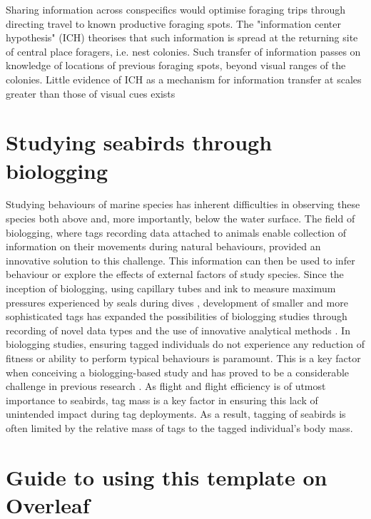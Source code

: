 \documentclass[9pt,twocolumn,twoside,lineno]{pnas-new}
\begin{document}

Sharing information across conspecifics would optimise foraging trips through directing travel to known productive foraging spots. The "information center hypothesis" (ICH) theorises that such information is spread at the returning site of central place foragers, i.e. nest colonies. Such transfer of information passes on knowledge of locations of previous foraging spots, beyond visual ranges of the colonies. Little evidence of ICH as a mechanism for information transfer at scales greater than those of visual cues exists \citep{Davoren_2003} 

\section{Studying seabirds through biologging}
Studying behaviours of marine species has inherent difficulties in observing these species both above and, more importantly, below the water surface. The field of biologging, where tags recording data attached to animals enable collection of information on their movements during natural behaviours, provided an innovative solution to this challenge. This information can then be used to infer behaviour or explore the effects of external factors of study species. Since the inception of biologging, using capillary tubes and ink to measure maximum pressures experienced by seals during dives \citep{Kooyman_1965}, development of smaller and more sophisticated tags has expanded the possibilities of biologging studies through recording of novel data types and the use of innovative analytical methods \citep{Kooyman_2004}. In biologging studies, ensuring tagged individuals do not experience any reduction of fitness or ability to perform typical behaviours is paramount. This is a key factor when conceiving a biologging-based study and has proved to be a considerable challenge in previous research \citep{Gessaman_1988, Bowlin_2010}. As flight and flight efficiency is of utmost importance to seabirds, tag mass is a key factor in ensuring this lack of unintended impact during tag deployments. As a result, tagging of seabirds is often limited by the relative mass of tags to the tagged individual's body mass.



\section*{Guide to using this template on Overleaf}
\end{document}

